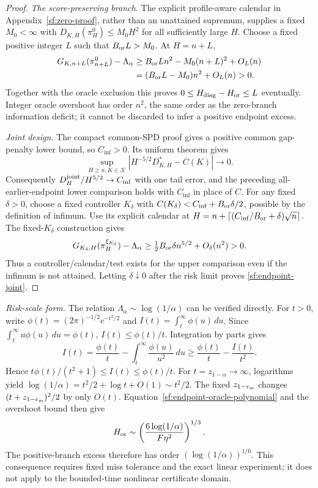\begin{proof}
\par\smallskip\noindent\emph{The score-preserving branch.}
The explicit profile-aware calendar in Appendix~\ref{sf:zero-proof},
rather than an unattained supremum, supplies a fixed $M_0<\infty$ with
$D_{K,H}(\pi_H^0)\le M_0H^2$ for all sufficiently large $H$.
Choose a fixed positive integer $L$ such that $B_{\rm or}L>M_0$.
At $H=n+L$,
\begin{equation}\label{sf:endpoint-zero-upper}
\begin{aligned}
G_{K,n+L}(\pi_{n+L}^0)-\Lambda_\alpha
 &\ge B_{\rm or}Ln^2-M_0(n+L)^2+O_L(n)\\
 &=(B_{\rm or}L-M_0)n^2+O_L(n)>0.
\end{aligned}
\end{equation}
Together with the oracle exclusion this proves
$0\le H_{\rm diag}-H_{\rm or}\le L$ eventually. Integer oracle overshoot
has order $n^2$, the same order as the zero-branch information deficit;
it cannot be discarded to infer a positive endpoint excess.

\par\smallskip\noindent\emph{Joint design.}
The compact common-SPD proof gives a positive common gap-penalty lower bound,
so $C_{\inf}>0$. Its uniform theorem gives
\[
\sup_{H\ge n,K\in\mathcal K}
\left|H^{-5/2}D_{K,H}^*-C(K)\right|\longrightarrow0.
\]
Consequently $D_H^{\rm joint}/H^{5/2}\to C_{\inf}$ with one tail error,
and the preceding all-earlier-endpoint lower comparison holds with
$C_{\inf}$ in place of $C$.
For any fixed $\delta>0$, choose a fixed controller $K_\delta$ with
$C(K_\delta)<C_{\inf}+B_{\rm or}\delta/2$, possible by the definition of
infimum. Use its explicit calendar at
$H=n+\lceil(C_{\inf}/B_{\rm or}+\delta)\sqrt n\rceil$.
The fixed-$K_\delta$ construction gives
\[
G_{K_\delta,H}(\pi_H^{\xi_{K_\delta}})-\Lambda_\alpha
 \ge \tfrac12B_{\rm or}\delta n^{5/2}+O_\delta(n^2)>0.
\]
Thus a controller/calendar/test exists for the upper comparison even if
the infimum is not attained. Letting $\delta\downarrow0$ after the risk limit
proves \eqref{sf:endpoint-joint}.
\end{proof}

\par\smallskip\noindent\emph{Risk-scale form.}
The relation $\Lambda_\alpha\sim\log(1/\alpha)$ can be verified directly.
For $t>0$, write $\phi(t)=(2\pi)^{-1/2}e^{-t^2/2}$ and
$I(t)=\int_t^\infty\phi(u)\,du$. Since
$\int_t^\infty u\phi(u)\,du=\phi(t)$, $I(t)\le\phi(t)/t$.
Integration by parts gives
\[
I(t)=\frac{\phi(t)}t-\int_t^\infty\frac{\phi(u)}{u^2}\,du
 \ge\frac{\phi(t)}t-\frac{I(t)}{t^2}.
\]
Hence $t\phi(t)/(t^2+1)\le I(t)\le\phi(t)/t$.
For $t=z_{1-\alpha}\to\infty$, logarithms yield
$\log(1/\alpha)=t^2/2+\log t+O(1)\sim t^2/2$.
The fixed $z_{1-\varepsilon_{\rm m}}$ changes
$(t+z_{1-\varepsilon_{\rm m}})^2/2$ by only $O(t)$.
Equation~\eqref{sf:endpoint-oracle-polynomial} and the overshoot bound then give
\[
H_{\rm or}\sim
\left(\frac{6\log(1/\alpha)}{F\eta^2}\right)^{1/3}.
\]
The positive-branch excess therefore has order $(\log(1/\alpha))^{1/6}$.
This consequence requires fixed miss tolerance and the exact linear experiment;
it does not apply to the bounded-time nonlinear certificate domain.

